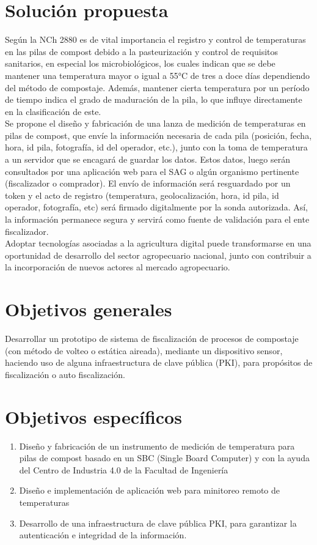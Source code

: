 \documentclass[12pt, letterpaper]{article}
\begin{document}
\section{Solución propuesta}
Según la NCh 2880 es de vital importancia el registro y control de temperaturas en las pilas de compost debido a la pasteurización y control de requisitos sanitarios, en especial los microbiológicos, los cuales indican que se debe mantener una temperatura mayor o igual a 55°C de tres a doce días dependiendo del método de compostaje. Además, mantener cierta temperatura por un período de tiempo indica el grado de maduración de la pila, lo que influye directamente en la clasificación de este. \\
Se propone el diseño y fabricación de una lanza de medición de temperaturas en pilas de compost, que envíe la información necesaria de cada pila (posición, fecha, hora, id pila, fotografía, id del operador, etc.), junto con la toma de temperatura a un servidor que se encagará de guardar los datos. Estos datos, luego serán consultados por una aplicación web para el SAG o algún organismo pertinente (fiscalizador o comprador). El envío de información será resguardado por un token y el acto de registro (temperatura, geolocalización, hora, id pila, id operador, fotografía, etc) será firmado digitalmente por la sonda autorizada. Así, la información permanece segura y servirá como fuente de validación para el ente fiscalizador. \\
Adoptar tecnologías asociadas a la agricultura digital puede transformarse en una oportunidad de desarrollo del sector agropecuario nacional, junto con contribuir a la incorporación de nuevos actores al mercado agropecuario.


\section{Objetivos generales}
Desarrollar un prototipo de sistema de fiscalización  de procesos de compostaje (con método de volteo o estática aireada), mediante un dispositivo sensor, haciendo uso de alguna infraestructura de clave pública (PKI), para propósitos de fiscalización o auto fiscalización.

\section{Objetivos específicos}
\begin{enumerate}
	\item Diseño y fabricación de un instrumento de medición de temperatura para pilas de compost basado en un SBC (Single Board Computer) y con la ayuda del Centro de Industria 4.0 de la Facultad de Ingeniería
	\item Diseño e implementación de aplicación web para minitoreo remoto de temperaturas
	\item Desarrollo de una infraestructura de clave pública PKI, para garantizar la  autenticación e integridad de la información.
\end{enumerate}
\end{document}
